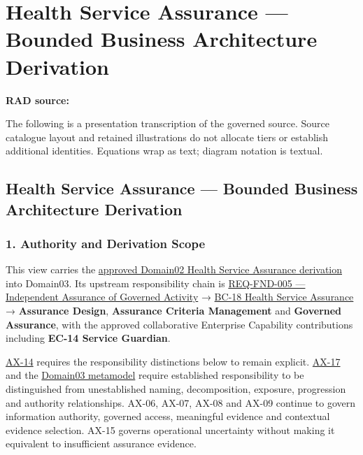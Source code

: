 \chapter{Health Service Assurance — Bounded Business Architecture Derivation}\label{rad:assurance}
\noindent\textbf{RAD source:} \texttt{}

The following is a presentation transcription of the governed source. Source catalogue layout and retained illustrations do not allocate tiers or establish additional identities. Equations wrap as text; diagram notation is textual.

\label{rad:assurance:1}
\section*{Health Service Assurance — Bounded Business Architecture Derivation}
\label{rad:assurance:3}
\subsection*{1. Authority and Derivation Scope}
\label{rad:assurance:5}

This view carries the \hyperref[rad:assurance-strategy]{approved Domain02 Health Service Assurance derivation} into Domain03. Its upstream responsibility chain is \href{https://github.com/fhirfactory/harmonia/blob/98410db60155198a75f74c79d98060070209faa1/docs/markdown/01-motivation/requirements-constraints/foundational-requirements.md\#req-fnd-005-independent-assurance-of-governed-activity}{REQ-FND-005 — Independent Assurance of Governed Activity} → \hyperref[rad:business:1033]{BC-18 Health Service Assurance} → \textbf{Assurance Design}, \textbf{Assurance Criteria Management} and \textbf{Governed Assurance}, with the approved collaborative Enterprise Capability contributions including \textbf{EC-14 Service Guardian}.

\label{rad:assurance:7}

\href{https://github.com/fhirfactory/harmonia/blob/98410db60155198a75f74c79d98060070209faa1/docs/markdown/governance/architectural-axioms.md\#ax-14}{AX-14} requires the responsibility distinctions below to remain explicit. \href{https://github.com/fhirfactory/harmonia/blob/98410db60155198a75f74c79d98060070209faa1/docs/markdown/governance/architectural-axioms.md\#ax-17}{AX-17} and the \hyperref[rad:metamodel]{Domain03 metamodel} require established responsibility to be distinguished from unestablished naming, decomposition, exposure, progression and authority relationships. AX-06, AX-07, AX-08 and AX-09 continue to govern information authority, governed access, meaningful evidence and contextual evidence selection. AX-15 governs operational uncertainty without making it equivalent to insufficient assurance evidence.

